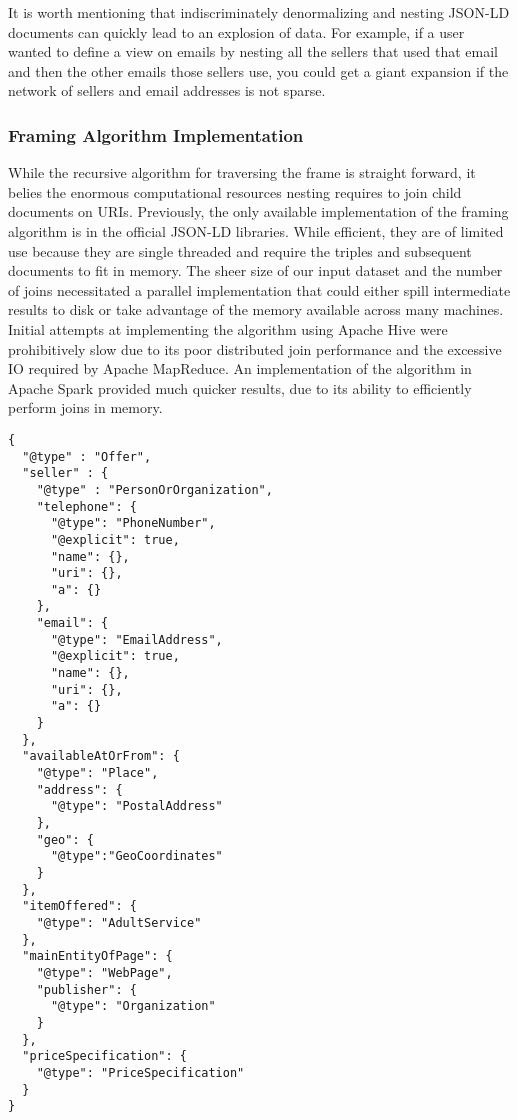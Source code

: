 It is worth mentioning that indiscriminately denormalizing and nesting JSON-LD documents can quickly lead to an explosion of data.  For example, if a user wanted to define a view on emails by nesting all the sellers that used that email and then the other emails those sellers use, you could get a giant expansion if the network of sellers and email addresses is not sparse.    

\subsubsection{Framing Algorithm Implementation}
While the recursive algorithm for traversing the frame is straight forward, it belies the enormous computational resources nesting requires to join child documents on URIs.
Previously, the only available implementation of the framing algorithm is in the official JSON-LD libraries.  %
While efficient, they are of limited use because they are single threaded and require the triples and subsequent documents to fit in memory.
The sheer size of our input dataset and the number of joins necessitated a parallel implementation that could either spill intermediate results to disk or take advantage of the memory available across many machines. 
Initial attempts at implementing the algorithm using Apache Hive were prohibitively slow due to its poor distributed join performance and the excessive IO required by Apache MapReduce.  
An implementation of the algorithm in Apache Spark provided much quicker results, due to its ability to efficiently perform joins in memory.   

\begin{verbatim}
{ 
  "@type" : "Offer",
  "seller" : {
    "@type" : "PersonOrOrganization",
    "telephone": {
      "@type": "PhoneNumber",
      "@explicit": true,
      "name": {},
      "uri": {},
      "a": {}
    },
    "email": {
      "@type": "EmailAddress",
      "@explicit": true,
      "name": {},
      "uri": {},
      "a": {}
    }
  },
  "availableAtOrFrom": {
    "@type": "Place",
    "address": {
      "@type": "PostalAddress"
    },
    "geo": {
      "@type":"GeoCoordinates"
    }
  },
  "itemOffered": {
    "@type": "AdultService"
  },
  "mainEntityOfPage": {
    "@type": "WebPage",
    "publisher": {
      "@type": "Organization"
    }
  },
  "priceSpecification": {
    "@type": "PriceSpecification"
  }
}

\end{verbatim}

